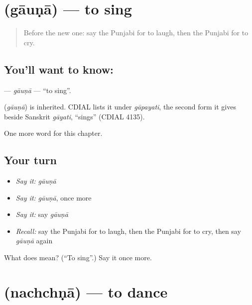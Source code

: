 \section[\texorpdfstring{\pa{ਗਾਉਣਾ} (gāuṇā)}{ਗਾਉਣਾ (gāuṇā)}]{ (gāuṇā) — to sing}

\label{lesson:PA-C59-gauna}



\begin{quote}
Before the new one: say the Punjabi for to laugh, then the Punjabi for to cry.
\end{quote}

\subsection*{You'll want to know: }
\textbf{} — \emph{gāuṇā} — \textquotedblleft{}to sing\textquotedblright{}.

\begin{cousinweb}
\textbf{} (\emph{gāuṇā}) is inherited. CDIAL lists it under \emph{gāpayati}, the second form it gives beside Sanskrit \emph{gāyati}, \textquotedblleft{}sings\textquotedblright{} (CDIAL 4135).
\end{cousinweb}

\begin{grammarlens}[title={What you've built}]
One more word for this chapter.
\end{grammarlens}

\subsection*{Your turn}
\begin{itemize}
\raggedright
  \item \emph{Say it:} \emph{gāuṇā}
  \item \emph{Say it:} \emph{gāuṇā}, once more
  \item \emph{Say it:} say \emph{gāuṇā}
  \item \emph{Recall:} say the Punjabi for to laugh, then the Punjabi for to cry, then say \emph{gāuṇā} again
\end{itemize}

\begin{tcolorbox}[breakable,colback=teal!4,colframe=teal!35!black,title={Before you move on}]
What does  mean? (\textquotedblleft{}To sing\textquotedblright{}.) Say it once more.
\end{tcolorbox}
\section[\texorpdfstring{\pa{ਨੱਚਣਾ} (nachchṇā)}{ਨੱਚਣਾ (nachchṇā)}]{ (nachchṇā) — to dance}

